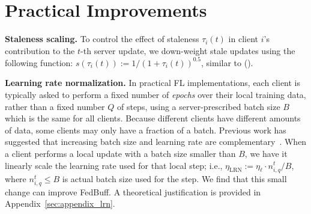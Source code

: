 \documentclass[twoside]{article}
\newcommand{\john}[1]{\todo[color=yellow!20,size=\footnotesize,inline,caption={}]{JN: #1}{}}
\newcommand{\mike}[1]{\todo[color=blue!20,size=\footnotesize,inline,caption={}]{MR: #1}{}}
\newcommand{\kshitiz}[1]{\todo[color=red!20,size=\footnotesize,inline,caption={}]{KM: #1}{}}
\DeclareMathOperator*{\lrnlocal}{LRN}
\newcommand{\algname}{{FedBuff}\xspace}
\begin{document}
\section{Practical Improvements}
\label{sec:improvement}
\textbf{Staleness scaling.}
To control the effect of staleness $\tau_i(t)$ in client $i$'s contribution to the $t$-th server update, we down-weight stale updates using the following function: $s(\tau_i(t)) := 1 / (1 + \tau_i(t))^{0.5}$, similar to (\cite{fedasync}).

\textbf{Learning rate normalization.}
In practical FL implementations, each client is typically asked to perform a fixed number of \emph{epochs} over their local training data, rather than a fixed number $Q$ of steps, using a server-prescribed batch size $B$ which is the same for all clients. Because different clients have different amounts of data, some clients may only have a fraction of a batch. Previous work has suggested that increasing batch size and learning rate are complementary~\citep{imagenet-1hr,increase_batchsize,three-factors}. When a client performs a local update with a batch size smaller than $B$, we have it linearly scale the learning rate used for that local step; i.e., $\eta_{\lrnlocal} := \eta_{\ell} \cdot n^t_{i,q} / B$, where $n^t_{i,q} \le B$ is actual batch size used for the step. We find that this small change can improve \algname. A theoretical justification is provided in Appendix~\ref{sec:appendix_lrn}.
\end{document}
